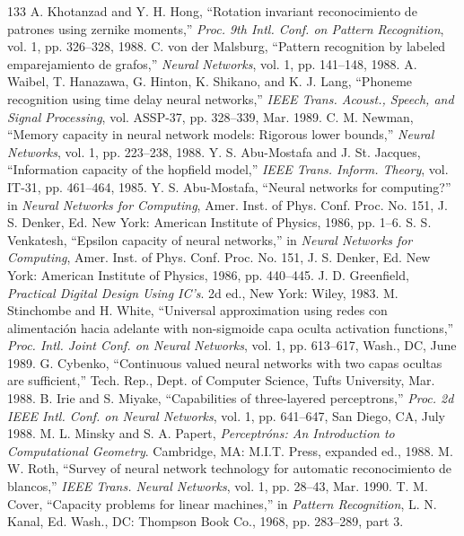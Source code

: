 \documentclass[10pt,twocolumn]{article}
\begin{document}
\begin{thebibliography}{133}
 A. Khotanzad and Y. H. Hong, ``Rotation invariant reconocimiento de patrones using zernike moments,'' \textit{Proc. 9th Intl. Conf. on Pattern Recognition}, vol. 1, pp. 326--328, 1988.
 C. von der Malsburg, ``Pattern recognition by labeled emparejamiento de grafos,'' \textit{Neural Networks}, vol. 1, pp. 141--148, 1988.
 A. Waibel, T. Hanazawa, G. Hinton, K. Shikano, and K. J. Lang, ``Phoneme recognition using time delay neural networks,'' \textit{IEEE Trans. Acoust., Speech, and Signal Processing}, vol. ASSP-37, pp. 328--339, Mar. 1989.
 C. M. Newman, ``Memory capacity in neural network models: Rigorous lower bounds,'' \textit{Neural Networks}, vol. 1, pp. 223--238, 1988.
 Y. S. Abu-Mostafa and J. St. Jacques, ``Information capacity of the hopfield model,'' \textit{IEEE Trans. Inform. Theory}, vol. IT-31, pp. 461--464, 1985.
 Y. S. Abu-Mostafa, ``Neural networks for computing?'' in \textit{Neural Networks for Computing}, Amer. Inst. of Phys. Conf. Proc. No. 151, J. S. Denker, Ed. New York: American Institute of Physics, 1986, pp. 1--6.
 S. S. Venkatesh, ``Epsilon capacity of neural networks,'' in \textit{Neural Networks for Computing}, Amer. Inst. of Phys. Conf. Proc. No. 151, J. S. Denker, Ed. New York: American Institute of Physics, 1986, pp. 440--445.
 J. D. Greenfield, \textit{Practical Digital Design Using IC's}. 2d ed., New York: Wiley, 1983.
 M. Stinchombe and H. White, ``Universal approximation using redes con alimentación hacia adelante with non-sigmoide capa oculta activation functions,'' \textit{Proc. Intl. Joint Conf. on Neural Networks}, vol. 1, pp. 613--617, Wash., DC, June 1989.
 G. Cybenko, ``Continuous valued neural networks with two capas ocultas are sufficient,'' Tech. Rep., Dept. of Computer Science, Tufts University, Mar. 1988.
 B. Irie and S. Miyake, ``Capabilities of three-layered perceptrons,'' \textit{Proc. 2d IEEE Intl. Conf. on Neural Networks}, vol. 1, pp. 641--647, San Diego, CA, July 1988.
 M. L. Minsky and S. A. Papert, \textit{Perceptróns: An Introduction to Computational Geometry}. Cambridge, MA: M.I.T. Press, expanded ed., 1988.
 M. W. Roth, ``Survey of neural network technology for automatic reconocimiento de blancos,'' \textit{IEEE Trans. Neural Networks}, vol. 1, pp. 28--43, Mar. 1990.
 T. M. Cover, ``Capacity problems for linear machines,'' in \textit{Pattern Recognition}, L. N. Kanal, Ed. Wash., DC: Thompson Book Co., 1968, pp. 283--289, part 3.

\end{thebibliography}
\end{document}
